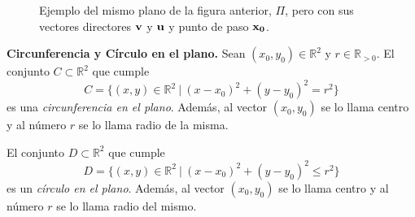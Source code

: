  \begin{figure}[H]
  \begin{center}
   \caption{Ejemplo del mismo plano de la figura anterior, $\Pi$, pero con sus vectores directores $\vect{v}$ y $\vect{u}$ y punto de paso $\vect{x_0}$.}
   \end{center}
 \end{figure}
\begin{definition}{\textbf{Circunferencia y Círculo en el plano.}} 
  Sean  $(x_0,y_0) \in \mathbb{R}^2$ y $r \in \mathbb{R}_{ > 0}. $
  El conjunto $C \subset \mathbb{R}^2$ que cumple
    \begin{equation*}\label{circ}
    C = \{  (x,y)  \in \mathbb{R}^2 \:|\:   (x-x_0)^2+(y-y_0)^2=r^2 \}
    \end{equation*}  es una \textit{circunferencia en el plano}. Adem\'as, al vector $(x_0,y_0)$  se lo llama centro y al n\'umero $r$  se lo llama radio de la misma.
   
  El conjunto $D \subset \mathbb{R}^2$ que cumple
    \begin{equation*}
    D = \{  (x,y)  \in \mathbb{R}^2 \:|\:   (x-x_0)^2+(y-y_0)^2 \leq r^2 \}
    \end{equation*}  es un \textit{c\'irculo en el plano}. Adem\'as, al vector $(x_0,y_0)$  se lo llama centro y al n\'umero $r$  se lo llama radio del mismo.  
   \end{definition}
